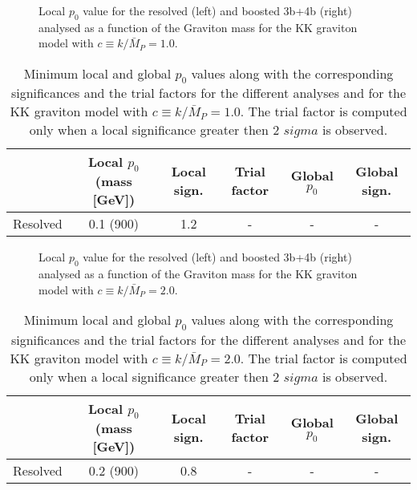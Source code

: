 \begin{figure}[ht!]
\begin{center}
\caption{Local $p_0$ value for the resolved (left) and boosted 3b+4b (right) analysed as a function of the Graviton mass for the KK graviton model
with $c \equiv k/\bar{M}_P = 1.0$.}
\label{fig:p0_RSG10}
\end{center}
\end{figure}

\begin{table}[ht!]
\begin{center}
\begin{tabular}{l|c|c|c|c|c}
                  & Local $p_0$ (mass [GeV]) & Local sign. & Trial factor & Global $p_0$ & Global sign. \\ 
  \hline
  \hline
Resolved          & 0.1 (900)        & 1.2         & -         & -        & - \\  
  \hline
\end{tabular}
\caption{Minimum local and global $p_0$ values along with the corresponding significances
  and the trial factors for the different analyses and for the KK graviton model
  with $c \equiv k/\bar{M}_P = 1.0$. The trial factor is computed only when a local
significance greater then 2 $sigma$ is observed.}
\label{tab:p0_RSG10}
\end{center}
\end{table}

\clearpage

\begin{figure}[ht!]
\begin{center}
\caption{Local $p_0$ value for the resolved (left) and boosted 3b+4b (right) analysed as a function of the Graviton mass for the KK graviton model
with $c \equiv k/\bar{M}_P = 2.0$.}
\label{fig:p0_RSG20}
\end{center}
\end{figure}

\begin{table}[ht!]
\begin{center}
\begin{tabular}{l|c|c|c|c|c}
                  & Local $p_0$ (mass [GeV]) & Local sign. & Trial factor & Global $p_0$ & Global sign. \\ 
  \hline
  \hline
Resolved          & 0.2 (900)        & 0.8         & -         & -        & - \\  
   \hline
\end{tabular}
\caption{Minimum local and global $p_0$ values along with the corresponding significances
  and the trial factors for the different analyses and for the KK graviton model
  with $c \equiv k/\bar{M}_P = 2.0$. The trial factor is computed only when a local
significance greater then 2 $sigma$ is observed.}
\label{tab:p0_RSG20}
\end{center}
\end{table}

